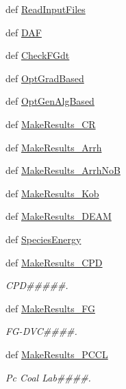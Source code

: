 \begin{DoxyCompactItemize}
\item 
def \hyperlink{classPKP_1_1MainProcess_ab5059e3580c970c191de84ae1e25fe8c}{\-Read\-Input\-Files}
\item 
def \hyperlink{classPKP_1_1MainProcess_ac5f854f9fa984c5ca6a6a333a83f77eb}{\-D\-A\-F}
\item 
def \hyperlink{classPKP_1_1MainProcess_a6c49797996cc149cfd2de63122e3a615}{\-Check\-F\-Gdt}
\item 
def \hyperlink{classPKP_1_1MainProcess_a0fa4ef702d8ec3175955b2939af295b9}{\-Opt\-Grad\-Based}
\item 
def \hyperlink{classPKP_1_1MainProcess_a8b8c1b91959f9f262f2514eb6c2f349d}{\-Opt\-Gen\-Alg\-Based}
\item 
def \hyperlink{classPKP_1_1MainProcess_a960469c19c0e1e8169c6c992afd78950}{\-Make\-Results\-\_\-\-C\-R}
\item 
def \hyperlink{classPKP_1_1MainProcess_a642510fcbcb9c34a51b091ddb443172f}{\-Make\-Results\-\_\-\-Arrh}
\item 
def \hyperlink{classPKP_1_1MainProcess_aec0b2160b99d37be512d95b073c951e2}{\-Make\-Results\-\_\-\-Arrh\-No\-B}
\item 
def \hyperlink{classPKP_1_1MainProcess_a6602f19bb73edc8c73e581c4e15c45f7}{\-Make\-Results\-\_\-\-Kob}
\item 
def \hyperlink{classPKP_1_1MainProcess_a3af8fe570e85cad7b642e50b69bec6d9}{\-Make\-Results\-\_\-\-D\-E\-A\-M}
\item 
def \hyperlink{classPKP_1_1MainProcess_aec9a7aa5c7408ebcddc0556d2b6c846f}{\-Species\-Energy}
\item 
def \hyperlink{classPKP_1_1MainProcess_a4182406298e12fb3146a76b92c1f8d95}{\-Make\-Results\-\_\-\-C\-P\-D}
\begin{DoxyCompactList}\small\item\em \-C\-P\-D\#\#\#\#\#. \end{DoxyCompactList}\item 
def \hyperlink{classPKP_1_1MainProcess_af85f5c6e49fa5d56b6721e621c720f4d}{\-Make\-Results\-\_\-\-F\-G}
\begin{DoxyCompactList}\small\item\em \-F\-G-\/\-D\-V\-C\#\#\#\#. \end{DoxyCompactList}\item 
def \hyperlink{classPKP_1_1MainProcess_a8cc3c77810057506f46f10181a8e1272}{\-Make\-Results\-\_\-\-P\-C\-C\-L}
\begin{DoxyCompactList}\small\item\em \-Pc \-Coal \-Lab\#\#\#\#. \end{DoxyCompactList}\end{DoxyCompactItemize}
